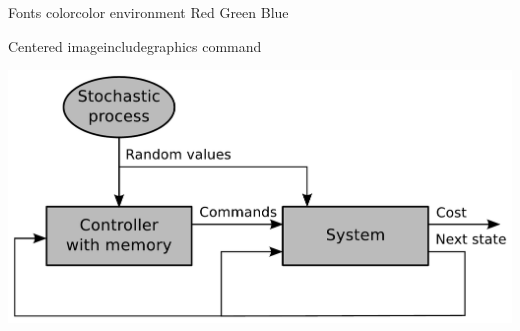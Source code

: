 \begin{frame}{Fonts color}{color environment}
    {\color{red} Red}
    {\color{green} Green}
    {\color{blue} Blue}
\end{frame}
\note{
}


\begin{frame}{Centered image}{includegraphics command}
    \begin{center}
        \includegraphics[width=.80\linewidth]{fig/test}
    \end{center}
\end{frame}
\note{
}


